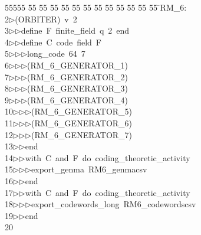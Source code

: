 %
%
\begin{tabbing}
55555 \= 55 \= 55 \= 55 \= 55 \= 55 \= 55 \= 55 \= 55 \= 55 \= 55 \= 55 \= 55 \= \>RM\_6:\\[0pt]
2\>$\triangleright$\>(ORBITER)\ v\ 2\ \\[0pt]
3\>$\triangleright$\>$\triangleright$\>define\ F\ finite\_field\ q\ 2\ end\ \\[0pt]
4\>$\triangleright$\>$\triangleright$\>define\ C\ code\ field\ F\ \\[0pt]
5\>$\triangleright$\>$\triangleright$\>$\triangleright$\>long\_code\ 64\ 7\ \\[0pt]
6\>$\triangleright$\>$\triangleright$\>$\triangleright$\>(RM\_6\_GENERATOR\_1)\ \\[0pt]
7\>$\triangleright$\>$\triangleright$\>$\triangleright$\>(RM\_6\_GENERATOR\_2)\ \\[0pt]
8\>$\triangleright$\>$\triangleright$\>$\triangleright$\>(RM\_6\_GENERATOR\_3)\ \\[0pt]
9\>$\triangleright$\>$\triangleright$\>$\triangleright$\>(RM\_6\_GENERATOR\_4)\ \\[0pt]
10\>$\triangleright$\>$\triangleright$\>$\triangleright$\>(RM\_6\_GENERATOR\_5)\ \\[0pt]
11\>$\triangleright$\>$\triangleright$\>$\triangleright$\>(RM\_6\_GENERATOR\_6)\ \\[0pt]
12\>$\triangleright$\>$\triangleright$\>$\triangleright$\>(RM\_6\_GENERATOR\_7)\ \\[0pt]
13\>$\triangleright$\>$\triangleright$\>end\ \\[0pt]
14\>$\triangleright$\>$\triangleright$\>with\ C\ and\ F\ do\ coding\_theoretic\_activity\ \\[0pt]
15\>$\triangleright$\>$\triangleright$\>$\triangleright$\>export\_genma\ RM6\_genmacsv\ \\[0pt]
16\>$\triangleright$\>$\triangleright$\>end\ \\[0pt]
17\>$\triangleright$\>$\triangleright$\>with\ C\ and\ F\ do\ coding\_theoretic\_activity\ \\[0pt]
18\>$\triangleright$\>$\triangleright$\>$\triangleright$\>export\_codewords\_long\ RM6\_codewordscsv\ \\[0pt]
19\>$\triangleright$\>$\triangleright$\>end\ \\[0pt]
20\>\end{tabbing}

